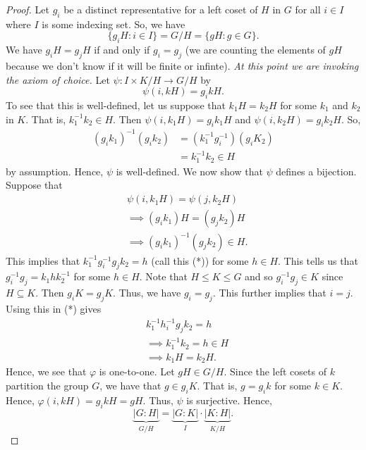 \begin{proof}
Let \( {g}_{i} \) be a distinct representative for a left coset of \( H  \) in \( G  \) for all \( i \in I  \) where \( I  \) is some indexing set. So, we have  
\[  \{  {g}_{i} H  :  i \in I  \}  = G / H = \{  g H : g \in G  \}.   \]
We have \( {g}_{i} H = {g}_{j} H  \) if and only if \( {g}_{i} = {g}_{j} \) (we are counting the elements of \( g H  \) because we don't know if it will be finite or infinte). \textit{At this point we are invoking the axiom of choice.} Let \( \psi : I \times K / H \to G / H  \) by 
\[  \psi(i, kH) = {g}_{i} kH.  \]
To see that this is well-defined, let us suppose that \( {k}_{1} H = {k}_{2} H  \) for some \( {k}_{1}  \) and \( {k}_{2}  \) in \( K  \). That is, \( {k }_{1}^{-1} {k}_{2} \in H \). Then \( \psi (i, {k}_{1}H) = {g}_{i} {k}_{1} H  \) and \( \psi(i, {k}_{2} H ) = {g}_{i} {k}_{2} H  \). So, 
\begin{align*}
    ({g}_{i} {k}_{1})^{-1} ({g}_{i} {k}_{2}) &= ({k}_{1}^{-1} {g}_{i}^{-1})({g}_{i} {K}_{2}) \\
                                             &= {k}_{1}^{-1} {k}_{2} \in H 
\end{align*}
by assumption. Hence, \( \psi  \) is well-defined. We now show that \( \psi  \) defines a bijection. Suppose that 
\begin{align*}
&\psi(i, {k}_{1} H ) = \psi (j, {k}_{2} H ) \\ 
&\implies ({g}_{i}{k}_{1}) H = ({g}_{j} {k}_{2}) H \\
&\implies ({g}_{i} {k}_{1})^{-1} ({g}_{j} {k}_{2}) \in H. 
\end{align*}
This implies that \( {k}_{1}^{-1} {g}_{i}^{-1} {g}_{j} {k}_{2} = h   \) (call this (*)) for some \( h \in  H \). This tells us that \( {g}_{i}^{-1} g_{j} = {k}_{1} h {k}_{2}^{-1} \) for some \( h \in H  \). Note that \( H \leq K \leq G  \) and so \( {g}_{i}^{-1} {g}_{j} \in K  \) since \( H \subseteq  K  \). Then \( {g}_{i} K = {g}_{j} K  \). Thus, we have \( {g}_{i} = {g}_{j} \). This further implies that \( i = j  \). Using this in (*) gives 
\begin{align*}
    &{k}_{1}^{-1} {h}_{i}^{-1} {g}_{j} {k}_{2} = h  \\
    &\implies {k}_{1}^{-1} {k}_{2} = h \in H \\
    &\implies {k}_{1} H = {k}_{2} H.
\end{align*}
Hence, we see that \( \varphi  \) is one-to-one. Let \( g H \in G / H  \). Since the left cosets of \( k  \) partition the group \( G  \), we have that \( g \in {g}_{i} K  \). That is, \( g = {g}_{i} k  \) for some \( k \in K  \). Hence, \( \varphi(i, k H ) = {g}_{i} k H = g H  \). Thus, \( \psi  \) is surjective. Hence, 
\[  \underbrace{| G : H  |}_{G /H }  = \underbrace{| G : K  |}_{I}  \cdot \underbrace{| K : H  |}_{K/H}. \]
\end{proof}

